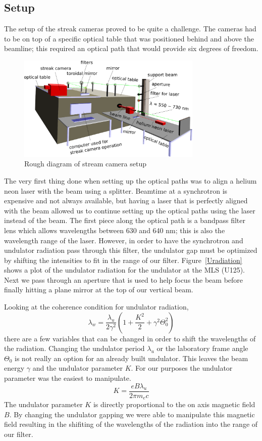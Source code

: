 \documentclass[%
 reprint,%
 amssymb, amsmath,%
 aip,cha,%
]{revtex4-1}
\begin{document}
\subsection{Setup\cite{Note3}}
The setup of the streak cameras proved to be quite a challenge. The cameras had to be on top of a specific optical table that was positioned behind and above the beamline; this required an optical path that would provide six degrees of freedom.
\begin{figure}[htb]
\begin{center}
\includegraphics[width=250pt]{diagramtext.pdf}
\caption{Rough diagram of stream camera setup}
\label{diagram}
\end{center}
\end{figure}

The very first thing done when setting up the optical paths was to align a helium neon laser with the beam using a splitter. Beamtime at a synchrotron is expensive and not always available, but having a laser that is perfectly aligned with the beam allowed us to continue setting up the optical paths using the laser instead of the beam. The first piece along the optical path is a bandpass filter lens which allows wavelengths between 630 and 640 nm; this is also the wavelength range of the laser. However, in order to have the synchrotron and undulator radiation pass through this filter, the undulator gap must be optimized by shifting the intensities to fit in the range of our filter. Figure~\ref{Uradiation} shows a plot of the undulator radiation for the undulator at the MLS (U125). Next we pass through an aperture that is used to help focus the beam before finally hitting a plane mirror at the top of our vertical beam.

Looking at the coherence condition for undulator radiation, 
\begin{equation}
\lambda_w = \frac{\lambda_u}{2\gamma^2} (1 + \frac{K^2}{2} + \gamma^2\Theta_0^2)
\end{equation}
there are a few variables that can be changed in order to shift the wavelengths of the radiation. Changing the undulator period $\lambda_u$ or the laboratory frame angle $\Theta_0$ is not really an option for an already built undulator. This leaves the beam energy $\gamma$ and the undulator parameter $K$. For our purposes the undulator parameter was the easiest to manipulate.
\begin{equation}
K = \frac{e B \lambda_u}{2\pi m_e c}
\end{equation}
The undulator parameter $K$ is directly proportional to the on axis magnetic field $B$. By changing the undulator gapping we were able to manipulate this magnetic field resulting in the shifiting of the wavelengths of the radiation into the range of our filter.
\end{document}
